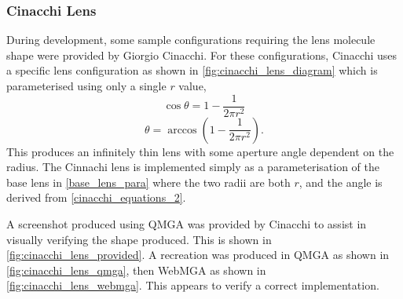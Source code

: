 \subsubsection{Cinacchi Lens}
During development, some sample configurations requiring the lens molecule shape were provided by Giorgio Cinacchi. For these configurations, Cinacchi uses a specific lens configuration as shown in \cref{fig:cinacchi_lens_diagram} which is parameterised using only a single $r$ value,
\begin{equation}
\cos\theta=1-\frac{1}{2\pi r^2}
\label{cinacchi_equations_1}
\end{equation}
\begin{equation}
\theta=\arccos\left(1-\frac{1}{2\pi r^2}\right).
\label{cinacchi_equations_2}
\end{equation}
This produces an infinitely thin lens with some aperture angle dependent on the radius. The Cinnachi lens is implemented simply as a parameterisation of the base lens in \cref{base_lens_para} where the two radii are both $r$, and the angle is derived from \cref{cinacchi_equations_2}.

A screenshot produced using QMGA was provided by Cinacchi to assist in visually verifying the shape produced. This is shown in \cref{fig:cinacchi_lens_provided}. A recreation was produced in QMGA as shown in \cref{fig:cinacchi_lens_qmga}, then WebMGA as shown in \cref{fig:cinacchi_lens_webmga}. This appears to verify a correct implementation.


